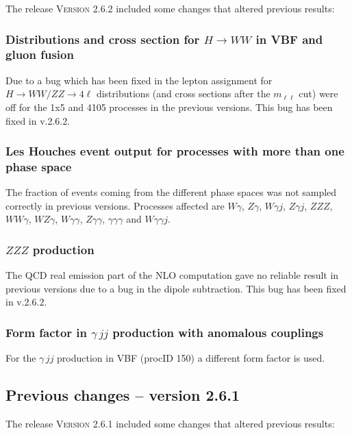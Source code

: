 \documentclass[english,12pt]{article}
\begin{document}
The release \textsc{Version 2.6.2} included some changes that altered previous results:

\subsubsection{Distributions and cross section for $H\to WW$ in VBF and gluon fusion}

Due to a bug which has been fixed in the lepton assignment for $H\to WW/ZZ \to 4\ell$ distributions
(and cross sections after the $m_{\ell\ell}$ cut) were off for the 1x5 and 4105 processes
in the previous versions. This bug has been fixed in v.2.6.2.

\subsubsection{Les Houches event output for processes with more than one phase space}

The fraction of events coming from the different phase spaces was not sampled correctly 
in previous versions. Processes affected are $W\gamma$, $Z\gamma$, $W\gamma j$,
$Z\gamma j$, $ZZZ$, $WW\gamma$, $WZ\gamma$, $W\gamma\gamma$, $Z\gamma\gamma$,
$\gamma\gamma\gamma$ and $W\gamma\gamma j$.

\subsubsection{$ZZZ$ production}

The QCD real emission part of the NLO computation gave no reliable result in previous versions
due to a bug in the dipole subtraction. This bug has been fixed in v.2.6.2.

\subsubsection{Form factor in $\gamma\,jj$ production with anomalous couplings}

 For the $\gamma\,jj$ production in VBF (procID 150) a different form factor is used.



\subsection{Previous changes -- version 2.6.1}

The release \textsc{Version 2.6.1} included some changes that altered previous results:
\end{document}
